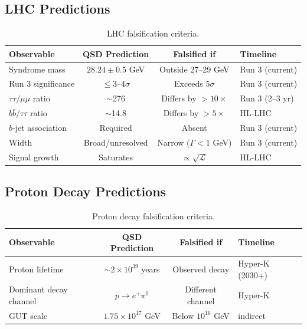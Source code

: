 \documentclass[11pt,a4paper]{article}
\theoremstyle{definition}
\theoremstyle{remark}
\begin{document}
\subsection{LHC Predictions}

\begin{table}[H]
\centering
\begin{tabular}{p{4.5cm}ccp{3.5cm}}
\toprule
\textbf{Observable} & \textbf{QSD Prediction} & \textbf{Falsified if} & \textbf{Timeline} \\
\midrule
Syndrome mass & $28.24 \pm 0.5$ GeV & Outside 27--29 GeV & Run 3 (current) \\
Run 3 significance & $\leq 3$--$4\sigma$ & Exceeds $5\sigma$ & Run 3 (current) \\
$\tau\tau/\mu\mu$ ratio & $\sim$276 & Differs by $>10\times$ & Run 3 (2--3 yr) \\
$b\bar{b}/\tau\tau$ ratio & $\sim$14.8 & Differs by $>5\times$ & HL-LHC \\
$b$-jet association & Required & Absent & Run 3 (current) \\
Width & Broad/unresolved & Narrow ($\Gamma < 1$ GeV) & Run 3 (current) \\
Signal growth & Saturates & $\propto \sqrt{\mathcal{L}}$ & HL-LHC \\
\bottomrule
\end{tabular}
\caption{LHC falsification criteria.}
\label{tab:LHC_falsify}
\end{table}

\subsection{Proton Decay Predictions}

\begin{table}[H]
\centering
\begin{tabular}{p{4.5cm}ccp{3.5cm}}
\toprule
\textbf{Observable} & \textbf{QSD Prediction} & \textbf{Falsified if} & \textbf{Timeline} \\
\midrule
Proton lifetime & $\sim 2 \times 10^{39}$ years & Observed decay & Hyper-K (2030+) \\
Dominant decay channel & $p \to e^+\pi^0$ & Different channel & Hyper-K \\
GUT scale & $1.75 \times 10^{17}$ GeV & Below $10^{16}$ GeV & indirect \\
\bottomrule
\end{tabular}
\caption{Proton decay falsification criteria.}
\label{tab:proton_falsify}
\end{table}
\end{document}
